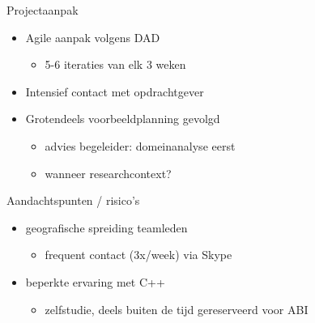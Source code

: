 \documentclass[10pt]{beamer}
\begin{document}
\begin{frame}{Projectaanpak}

\begin{itemize}
 \item Agile aanpak volgens DAD
 \begin{itemize}
  \item 5-6 iteraties van elk 3 weken
 \end{itemize}

 \item Intensief contact met opdrachtgever
 \item Grotendeels voorbeeldplanning gevolgd
 \begin{itemize}
  \item advies begeleider: domeinanalyse eerst
  \item wanneer researchcontext?
 \end{itemize}

\end{itemize}

    
\end{frame}


\begin{frame}{Aandachtspunten / risico's}

\begin{itemize}
 \item geografische spreiding teamleden
 \begin{itemize}
  \item frequent contact (3x/week) via Skype
 \end{itemize}

 \item beperkte ervaring met C++
 \begin{itemize}
  \item zelfstudie, deels buiten de tijd gereserveerd voor ABI
 \end{itemize}

\end{itemize}

    
\end{frame}
\end{document}
